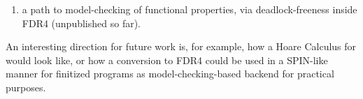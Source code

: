 \begin{isabellebody}
\begin{isamarkuptext}
\begin{enumerate}
\item a path to model-checking of functional properties,
via deadlock-freeness inside FDR4 (unpublished so far).%
\end{enumerate}%
\end{isamarkuptext}\isamarkuptrue%
%
\begin{isamarkuptext}%
An interesting direction for future work is, for example, how  a Hoare Calculus for  
would look like, or how a conversion to FDR4 could be used in a SPIN-like manner 
for finitized programs as model-checking-based backend for practical purposes.%
\end{isamarkuptext}\isamarkuptrue%
%
\isadelimtheory
%
\endisadelimtheory
%
\isatagtheory
%
\endisatagtheory
{\isafoldtheory}%
%
\isadelimtheory
%
\endisadelimtheory
%
\end{isabellebody}%
\endinput
